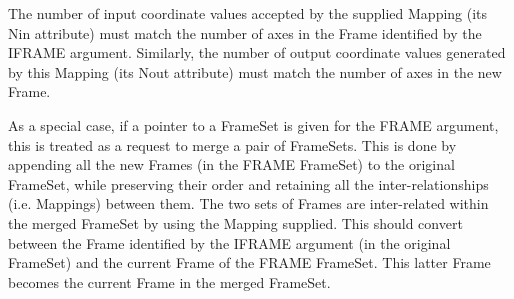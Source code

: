 \documentclass[twoside,11pt]{article}
\newcommand{\htmlref}[2]{#1}
\begin{document}
{{{         \sstitem
         The number of input coordinate values accepted by the supplied
         Mapping (its \htmlref{Nin}{Nin} attribute) must match the number of axes in the
         Frame identified by the IFRAME argument. Similarly, the
         number of output coordinate values generated by this Mapping
         (its \htmlref{Nout}{Nout} attribute) must match the number of axes in the new
         Frame.

         \sstitem
         As a special case, if a pointer to a FrameSet is given for the
         FRAME argument, this is treated as a request to merge a pair of
         FrameSets.  This is done by appending all the new Frames (in the
         FRAME FrameSet) to the original FrameSet, while preserving
         their order and retaining all the inter-relationships
         (i.e. Mappings) between them. The two sets of Frames are
         inter-related within the merged FrameSet by using the Mapping
         supplied. This should convert between the Frame identified by
         the IFRAME argument (in the original FrameSet) and the current
         Frame of the FRAME FrameSet. This latter Frame becomes the
         current Frame in the merged FrameSet.
      }
   }
}
\end{document}
